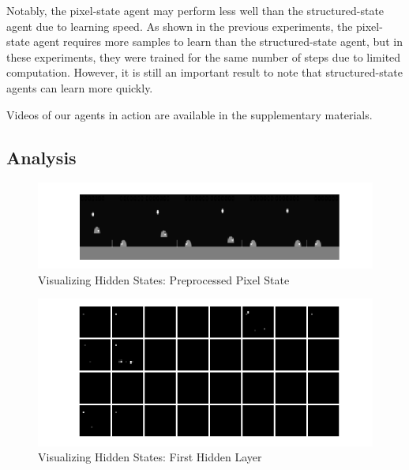 \documentclass[10pt,twocolumn,letterpaper]{article}
\begin{document}
Notably, the pixel-state agent may perform less well than the structured-state
agent due to learning speed. As shown in the previous experiments, the
pixel-state agent requires more samples to learn than the structured-state
agent, but in these experiments, they were trained for the same number of
steps due to limited computation. However, it is still an important result to
note that structured-state agents can learn more quickly.

Videos of our agents in action are available in the supplementary materials.

\subsection{Analysis}

\begin{figure}[h]
\center
\includegraphics[width=\columnwidth]{preprocess}
\caption{
Visualizing Hidden States: Preprocessed Pixel State
}\label{fig:preprocess}
\end{figure}

\begin{figure}[h]
\center
\includegraphics[width=\columnwidth]{layer1}
\caption{
Visualizing Hidden States: First Hidden Layer
}\label{fig:layer1}
\end{figure}
\end{document}
